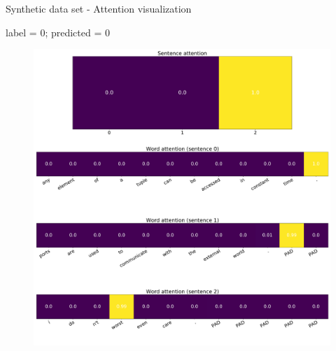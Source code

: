 \documentclass[10pt]{beamer}
\begin{document}
\begin{frame}{Synthetic data set - Attention visualization}

label = 0; predicted = 0

\begin{figure}
\centering
\includegraphics[scale=0.15]{img/synthetic-han-visual}
\end{figure}

\end{frame}
\end{document}
